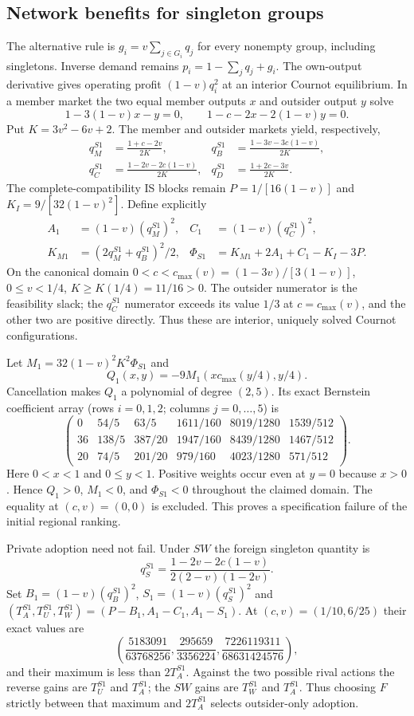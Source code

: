\subsection{Network benefits for singleton groups}
The alternative rule is $g_i=v\sum_{j\in G_i}q_j$ for every nonempty
group, including singletons. Inverse demand remains $p_i=1-\sum_jq_j+g_i$.
The own-output derivative gives operating profit $(1-v)q_i^2$ at an
interior Cournot equilibrium. In a member market the two equal member outputs
$x$ and outsider output $y$ solve
\[
1-3(1-v)x-y=0,\qquad 1-c-2x-2(1-v)y=0.
\]
Put $K=3v^2-6v+2$. The member and outsider markets yield, respectively,
\begin{align*}
q_M^{S1}&=\frac{1+c-2v}{2K},&
q_B^{S1}&=\frac{1-3v-3c(1-v)}{2K},\\
q_C^{S1}&=\frac{1-2v-2c(1-v)}{2K},&
q_D^{S1}&=\frac{1+2c-3v}{2K}.
\end{align*}
The complete-compatibility IS blocks remain $P=1/[16(1-v)]$ and
$K_I=9/[32(1-v)^2]$. Define explicitly
\begin{align*}
A_1&=(1-v)(q_M^{S1})^2,& C_1&=(1-v)(q_C^{S1})^2,\\
K_{M1}&=(2q_M^{S1}+q_B^{S1})^2/2,&
\Phi_{S1}&=K_{M1}+2A_1+C_1-K_I-3P.
\end{align*}
On the canonical domain $0<c<c_{\max}(v)=(1-3v)/[3(1-v)]$,
$0\le v<1/4$, $K\ge K(1/4)=11/16>0$. The outsider numerator is
the feasibility slack; the $q_C^{S1}$ numerator exceeds its value $1/3$
at $c=c_{\max}(v)$, and the other two are positive directly.
Thus these are interior, uniquely solved Cournot configurations.

Let $M_1=32(1-v)^2K^2\Phi_{S1}$ and
\[
Q_1(x,y)=-9M_1\left(xc_{\max}(y/4),y/4\right).
\]
Cancellation makes $Q_1$ a polynomial of degree $(2,5)$. Its exact Bernstein
coefficient array (rows $i=0,1,2$; columns $j=0,\ldots,5$) is
\[
\begin{pmatrix}
0&54/5&63/5&1611/160&8019/1280&1539/512\\
36&138/5&387/20&1947/160&8439/1280&1467/512\\
20&74/5&201/20&979/160&4023/1280&571/512
\end{pmatrix}.
\]
Here $0<x<1$ and $0\le y<1$. Positive weights occur even at $y=0$
because $x>0$. Hence $Q_1>0$, $M_1<0$, and $\Phi_{S1}<0$ throughout
the claimed domain. The equality at $(c,v)=(0,0)$ is excluded.
This proves a specification failure of the initial regional ranking.

Private adoption need not fail. Under $SW$ the foreign singleton quantity is
\[
q_S^{S1}=\frac{1-2v-2c(1-v)}{2(2-v)(1-2v)}.
\]
Set $B_1=(1-v)(q_B^{S1})^2$, $S_1=(1-v)(q_S^{S1})^2$ and
$(T_A^{S1},T_U^{S1},T_W^{S1})=(P-B_1,A_1-C_1,A_1-S_1)$.
At $(c,v)=(1/10,6/25)$ their exact values are
\[
\left(\frac{5183091}{63768256},
\frac{295659}{3356224},
\frac{7226119311}{68631424576}\right),
\]
and their maximum is less than $2T_A^{S1}$. Against the two possible
rival actions the reverse gains are $T_U^{S1}$ and $T_A^{S1}$; the $SW$
gains are $T_W^{S1}$ and $T_A^{S1}$. Thus choosing $F$ strictly between
that maximum and $2T_A^{S1}$ selects outsider-only adoption.

